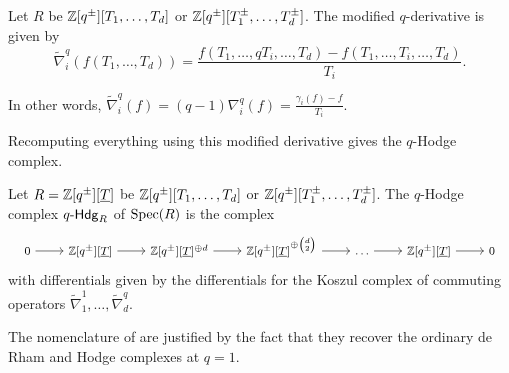 \begin{definition}\label{def: modified q-derivative}
    Let $R$ be $\mathbb{Z}[q^{\pm}][T_{1},\dots,T_{d}]$ or $\mathbb{Z}[q^{\pm}][T_{1}^{\pm},\dots,T_{d}^{\pm}]$. The modified $q$-derivative is given by 
    $$\widetilde{\nabla}_{i}^{q}(f(T_{1},\dots,T_{d}))=\frac{f(T_{1},\dots,qT_{i},\dots,T_{d})-f(T_{1},\dots,T_{i},\dots,T_{d})}{T_{i}}.$$
\end{definition}
\begin{remark}
    In other words, $\widetilde{\nabla}_{i}^{q}(f)=(q-1)\nabla_{i}^{q}(f)=\frac{\gamma_{i}(f)-f}{T_{i}}$.  
\end{remark}
Recomputing everything using this modified derivative gives the $q$-Hodge complex. 
\begin{definition}\label{def: q-Hodge complex}
    Let $R=\mathbb{Z}[q^{\pm}][\underline{T}]$ be $\mathbb{Z}[q^{\pm}][T_{1},\dots,T_{d}]$ or $\mathbb{Z}[q^{\pm}][T_{1}^{\pm},\dots,T_{d}^{\pm}]$. The $q$-Hodge complex $q\text{-}\mathsf{Hdg}_{R}$ of $\operatorname{Spec}(R)$ is the complex
    \begin{equation}\label{eqn: q-Hodge complex of R}
    \footnotesize
    \begin{tikzcd}
        0 & {\ZZ[q^{\pm}][\underline{T}]} & {\ZZ[q^{\pm}][\underline{T}]^{\oplus d}} & {\ZZ[q^{\pm}][\underline{T}]^{\oplus\binom{d}{2}}} & \dots & {\ZZ[q^{\pm}][\underline{T}]} & 0
        \arrow[from=1-1, to=1-2]
        \arrow[from=1-2, to=1-3]
        \arrow[from=1-3, to=1-4]
        \arrow[from=1-4, to=1-5]
        \arrow[from=1-5, to=1-6]
        \arrow[from=1-6, to=1-7]
    \end{tikzcd}
    \normalsize
    \end{equation}
    with differentials given by the differentials for the Koszul complex of commuting operators $\widetilde{\nabla}_{1}^{1},\dots,\widetilde{\nabla}_{d}^{q}$. 
\end{definition}
\begin{remark}
    The nomenclature of  are justified by the fact that they recover the ordinary de Rham and Hodge complexes at $q=1$.
\end{remark} 

